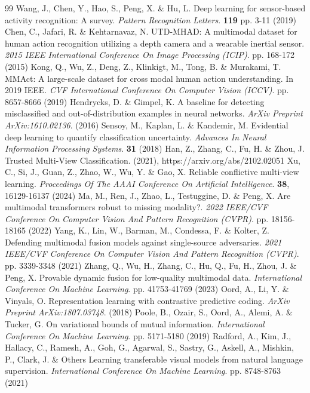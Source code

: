 \documentclass[conference]{IEEEtran}
\begin{document}
\begin{thebibliography}{99}
Wang, J., Chen, Y., Hao, S., Peng, X. \& Hu, L. Deep learning for sensor-based activity recognition: A survey. {\em Pattern Recognition Letters}. \textbf{119} pp. 3-11 (2019)
Chen, C., Jafari, R. \& Kehtarnavaz, N. UTD-MHAD: A multimodal dataset for human action recognition utilizing a depth camera and a wearable inertial sensor. {\em 2015 IEEE International Conference On Image Processing (ICIP)}. pp. 168-172 (2015)
Kong, Q., Wu, Z., Deng, Z., Klinkigt, M., Tong, B. \& Murakami, T. MMAct: A large-scale dataset for cross modal human action understanding. In 2019 IEEE. {\em CVF International Conference On Computer Vision (ICCV)}. pp. 8657-8666 (2019)
Hendrycks, D. \& Gimpel, K. A baseline for detecting misclassified and out-of-distribution examples in neural networks. {\em ArXiv Preprint ArXiv:1610.02136}. (2016)
Sensoy, M., Kaplan, L. \& Kandemir, M. Evidential deep learning to quantify classification uncertainty. {\em Advances In Neural Information Processing Systems}. \textbf{31} (2018)
Han, Z., Zhang, C., Fu, H. \& Zhou, J. Trusted Multi-View Classification.  (2021), https://arxiv.org/abs/2102.02051
Xu, C., Si, J., Guan, Z., Zhao, W., Wu, Y. \& Gao, X. Reliable conflictive multi-view learning. {\em Proceedings Of The AAAI Conference On Artificial Intelligence}. \textbf{38}, 16129-16137 (2024)
Ma, M., Ren, J., Zhao, L., Testuggine, D. \& Peng, X. Are multimodal transformers robust to missing modality?. {\em 2022 IEEE/CVF Conference On Computer Vision And Pattern Recognition (CVPR)}. pp. 18156-18165 (2022)
Yang, K., Lin, W., Barman, M., Condessa, F. \& Kolter, Z. Defending multimodal fusion models against single-source adversaries. {\em 2021 IEEE/CVF Conference On Computer Vision And Pattern Recognition (CVPR)}. pp. 3339-3348 (2021)
Zhang, Q., Wu, H., Zhang, C., Hu, Q., Fu, H., Zhou, J. \& Peng, X. Provable dynamic fusion for low-quality multimodal data. {\em International Conference On Machine Learning}. pp. 41753-41769 (2023)
Oord, A., Li, Y. \& Vinyals, O. Representation learning with contrastive predictive coding. {\em ArXiv Preprint ArXiv:1807.03748}. (2018)
Poole, B., Ozair, S., Oord, A., Alemi, A. \& Tucker, G. On variational bounds of mutual information. {\em International Conference On Machine Learning}. pp. 5171-5180 (2019)
Radford, A., Kim, J., Hallacy, C., Ramesh, A., Goh, G., Agarwal, S., Sastry, G., Askell, A., Mishkin, P., Clark, J. \& Others Learning transferable visual models from natural language supervision. {\em International Conference On Machine Learning}. pp. 8748-8763 (2021)

\end{thebibliography}
\end{document}

